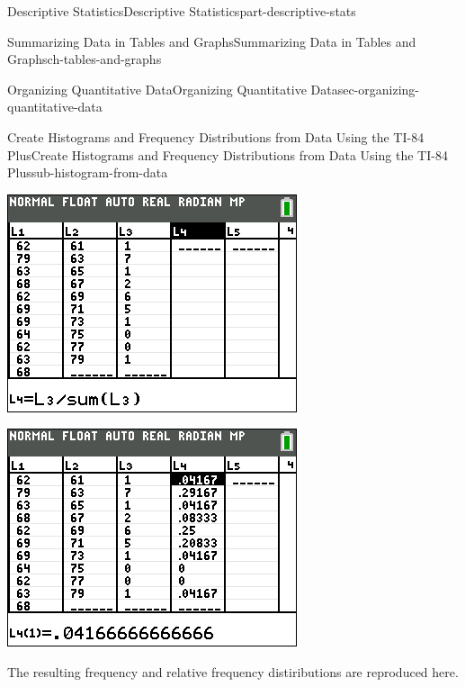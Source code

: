 \documentclass[oneside,10pt,]{book}
\numberwithin{equation}{section}
\begin{document}
\begin{partptx}{Descriptive Statistics}{}{Descriptive Statistics}{}{}{part-descriptive-stats}
\begin{chapterptx}{Summarizing Data in Tables and Graphs}{}{Summarizing Data in Tables and Graphs}{}{}{ch-tables-and-graphs}
\begin{sectionptx}{Organizing Quantitative Data}{}{Organizing Quantitative Data}{}{}{sec-organizing-quantitative-data}
\begin{subsectionptx}{Create Histograms and Frequency Distributions from Data Using the TI-84 Plus}{}{Create Histograms and Frequency Distributions from Data Using the TI-84 Plus}{}{}{sub-histogram-from-data}
\begin{enumerate}
\begin{sidebyside}{1}{0.2}{0.2}{0}
\begin{sbspanel}{0.6}
\end{sbspanel}%
\end{sidebyside}%
 \begin{sidebyside}{2}{0}{0}{0}%
\begin{sbspanel}{0.5}%
\includegraphics[width=1\linewidth]{images/generate-rel-freq.png}
\end{sbspanel}%
\begin{sbspanel}{0.5}%
\includegraphics[width=1\linewidth]{images/generated-rel-freq.png}
\end{sbspanel}%
\end{sidebyside}%
 The resulting frequency and relative frequency distiributions are reproduced here.%
\begin{table}

\end{table}
\end{enumerate}
\end{subsectionptx}
\end{sectionptx}
\end{chapterptx}
\end{partptx}
\end{document}
